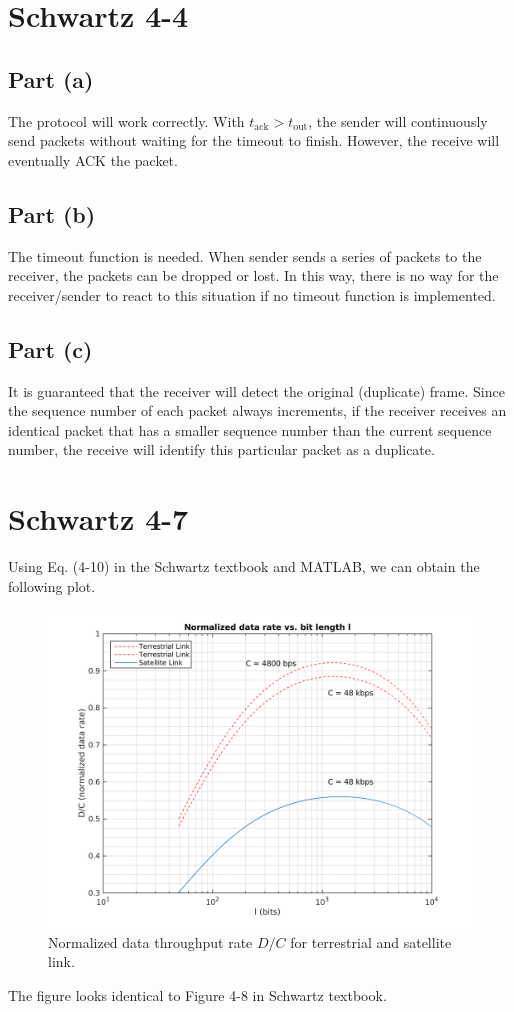 \documentclass{article}
\begin{document}
\section*{Schwartz 4-4}
	\subsection*{Part (a)}
		The protocol will work correctly. With $t_{\text{ack}} > t_{\text{out}}$,
		the sender will continuously send packets without waiting for the timeout
		to finish. However, the receive will eventually ACK the packet.
	\subsection*{Part (b)}
		The timeout function is needed. When sender sends a series of packets to
		the receiver, the packets can be dropped or lost. In this way, there is no
		way for the receiver/sender to react to this situation if no timeout
		function is implemented.
	\subsection*{Part (c)}
		It is guaranteed that the receiver will detect the original (duplicate)
		frame. Since the sequence number of each packet always increments, if the
		receiver receives an identical packet that has a smaller sequence number
		than the current sequence number, the receive will identify this particular
		packet as a duplicate.

\section*{Schwartz 4-7}
	Using Eq. (4-10) in the Schwartz textbook and MATLAB, we can obtain the
	following plot.
	\begin{figure}[!hbt]
		\centering
		\includegraphics[width=0.6\linewidth]{hw5_3_dr.png}
		\caption{Normalized data throughput rate $D/C$ for terrestrial and satellite link.}
	\end{figure}
	The figure looks identical to Figure 4-8 in Schwartz textbook.
\end{document}
